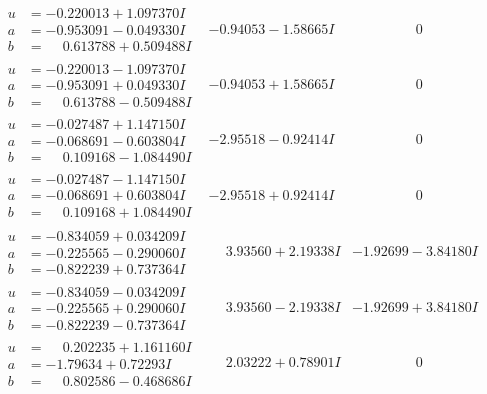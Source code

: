 \documentclass[1p]{elsarticle_modified}
\theoremstyle{definition}
\begin{document}
$$\begin{array}{c|c|c}
\begin{aligned}
u &= -0.220013 + 1.097370 I \\
a &= -0.953091 - 0.049330 I \\
b &= \phantom{-}0.613788 + 0.509488 I\end{aligned}
 & -0.94053 - 1.58665 I & \phantom{-0.000000 } 0 \\ \hline\begin{aligned}
u &= -0.220013 - 1.097370 I \\
a &= -0.953091 + 0.049330 I \\
b &= \phantom{-}0.613788 - 0.509488 I\end{aligned}
 & -0.94053 + 1.58665 I & \phantom{-0.000000 } 0 \\ \hline\begin{aligned}
u &= -0.027487 + 1.147150 I \\
a &= -0.068691 - 0.603804 I \\
b &= \phantom{-}0.109168 - 1.084490 I\end{aligned}
 & -2.95518 - 0.92414 I & \phantom{-0.000000 } 0 \\ \hline\begin{aligned}
u &= -0.027487 - 1.147150 I \\
a &= -0.068691 + 0.603804 I \\
b &= \phantom{-}0.109168 + 1.084490 I\end{aligned}
 & -2.95518 + 0.92414 I & \phantom{-0.000000 } 0 \\ \hline\begin{aligned}
u &= -0.834059 + 0.034209 I \\
a &= -0.225565 - 0.290060 I \\
b &= -0.822239 + 0.737364 I\end{aligned}
 & \phantom{-}3.93560 + 2.19338 I & -1.92699 - 3.84180 I \\ \hline\begin{aligned}
u &= -0.834059 - 0.034209 I \\
a &= -0.225565 + 0.290060 I \\
b &= -0.822239 - 0.737364 I\end{aligned}
 & \phantom{-}3.93560 - 2.19338 I & -1.92699 + 3.84180 I \\ \hline\begin{aligned}
u &= \phantom{-}0.202235 + 1.161160 I \\
a &= -1.79634 + 0.72293 I \\
b &= \phantom{-}0.802586 - 0.468686 I\end{aligned}
 & \phantom{-}2.03222 + 0.78901 I & \phantom{-0.000000 } 0 \\ \hline\begin{aligned}

\end{aligned}
\end{array}$$
\end{document}
